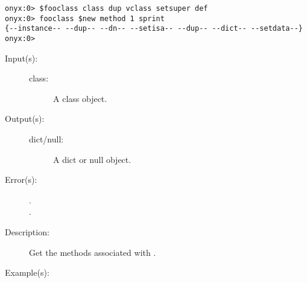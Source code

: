 \begin{description}
\begin{description}
\begin{verbatim}
onyx:0> $fooclass class dup vclass setsuper def
onyx:0> fooclass $new method 1 sprint
{--instance-- --dup-- --dn-- --setisa-- --dup-- --dict-- --setdata--}
onyx:0>
		\end{verbatim}
	\end{description}
\label{systemdict:methods}
\item[{\onyxop{class}{methods}{dict/null}}: ]
	\begin{description}\item[]
	\item[Input(s): ]
		\begin{description}\item[]
		\item[class: ]
			A class object.
		\end{description}
	\item[Output(s): ]
		\begin{description}\item[]
		\item[dict/null: ]
			A dict or null object.
		\end{description}
	\item[Error(s): ]
		\begin{description}\item[]
		\item[.]
		\item[.]
		\end{description}
	\item[Description: ]
		Get the methods associated with .
	\item[Example(s): ]\begin{verbatim}


\end{verbatim}
\end{description}
\end{description}
